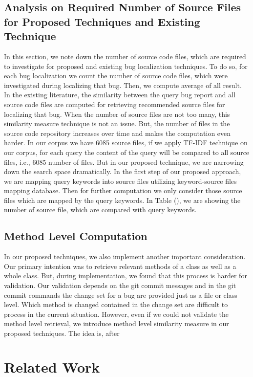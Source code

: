 \documentclass{sig-alternate}
\begin{document}
\subsection{Analysis on Required Number of Source Files for Proposed Techniques and Existing Technique}
In this section, we note down the number of source code files, which are required to investigate for proposed and existing bug localization techniques. To do so, for each bug localization we count the number of source code files, which were investigated during localizing that bug. Then, we compute average of all result. In the existing literature, the similarity between the query bug report and all source code files are computed for retrieving recommended source files for localizing that bug. When the number of source files are not too many, this similarity measure technique is not an issue. But, the number of files in the source code repository increases over time and makes the computation even harder. In our corpus we have 6085 source files, if we apply TF-IDF technique on our corpus, for each query the content of the query will be compared to all source files, i.e., 6085 number of files. But in our proposed technique, we are narrowing down the search space dramatically. In the first step of our proposed approach, we are mapping query keywords into source files utilizing keyword-source files mapping database. Then for further computation we only consider those source files which are mapped by the query keywords. In Table (), we are showing the number of source file, which are compared with query keywords. 

\subsection{Method Level Computation}
In our proposed techniques, we also implement another important consideration. Our primary intention was to retrieve relevant methods of a class as well as a whole class. But, during implementation, we found that this process is harder for validation. Our validation depends on the git commit messages and in the git commit commands the change set for a bug are provided just as a file or class level. Which method is changed contained in the change set are difficult to process in the current situation. However, even if we could not validate the method level retrieval, we introduce method level similarity measure in our proposed techniques. The idea is, after 

\section{Related Work}\label{sec:relatedWork}
\end{document}
